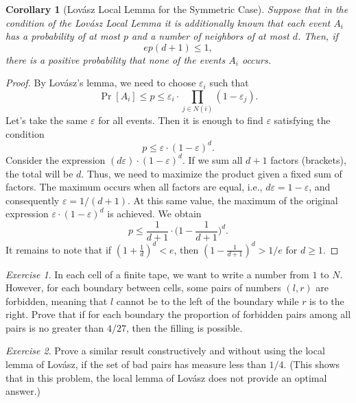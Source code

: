 \documentclass[12pt,sans]{article}
\theoremstyle{definition}
\theoremstyle{plain}
\newtheorem{corollary}{Corollary}[section]
\theoremstyle{remark}
\newtheorem{exercise}{Exercise}[section]
\begin{document}
\begin{corollary}[Lovász Local Lemma for the Symmetric Case]
    Suppose that in the condition of the Lovász Local Lemma it is additionally known that each event $A_i$
    has a probability of at most $p$ and a number of neighbors of at most $d$.
    Then, if \[ep(d + 1) \le 1,\] there is a positive probability that none of the events $A_i$ occurs.
\end{corollary}
\begin{proof}
    By Lovász's lemma, we need to choose $\varepsilon_i$ such that
    \[
    \Pr[A_i] \le p \le \varepsilon_i \cdot \prod_{j \in N(i)} (1 - \varepsilon_j).
    \]
    Let's take the same $\varepsilon$ for all events. Then it is enough to find $\varepsilon$ satisfying the condition
    \[
    p \le \varepsilon \cdot (1 - \varepsilon)^d.
    \]
    Consider the expression $(d\varepsilon) \cdot (1 - \varepsilon)^d$. If we sum all $d + 1$ factors (brackets), the total will be $d$. Thus, we need to maximize the product given a fixed sum of factors. The maximum occurs when all factors are equal, i.e., $d\varepsilon = 1 - \varepsilon$, and consequently $\varepsilon = 1/(d + 1)$.
    At this same value, the maximum of the original expression $\varepsilon \cdot (1 - \varepsilon)^d$ is achieved.
    We obtain
    \[
    p \le \frac{1}{d + 1} \cdot \biggl(1 - \frac{1}{d + 1}\biggr)^d.
    \]
    It remains to note that if $(1 + \frac{1}{d})^d < e$, then $(1 - \frac{1}{d + 1})^d > 1/e$ for $d \ge 1$.
\end{proof}

\begin{exercise}
    In each cell of a finite tape, we want to write a number from $1$ to $N$. However,
    for each boundary between cells, some pairs of numbers $(l,r)$ are forbidden,
    meaning that $l$ cannot be to the left of the boundary while $r$ is to the right. Prove
    that if for each boundary the proportion of forbidden pairs among all pairs is no greater
    than $4/27$, then the filling is possible.
\end{exercise}

\begin{exercise}
    Prove a similar result constructively and without using the local lemma of Lovász,
    if the set of bad pairs has measure less than $1/4$. (This shows that in this
    problem, the local lemma of Lovász does not provide an optimal answer.)
\end{exercise}
\end{document}
